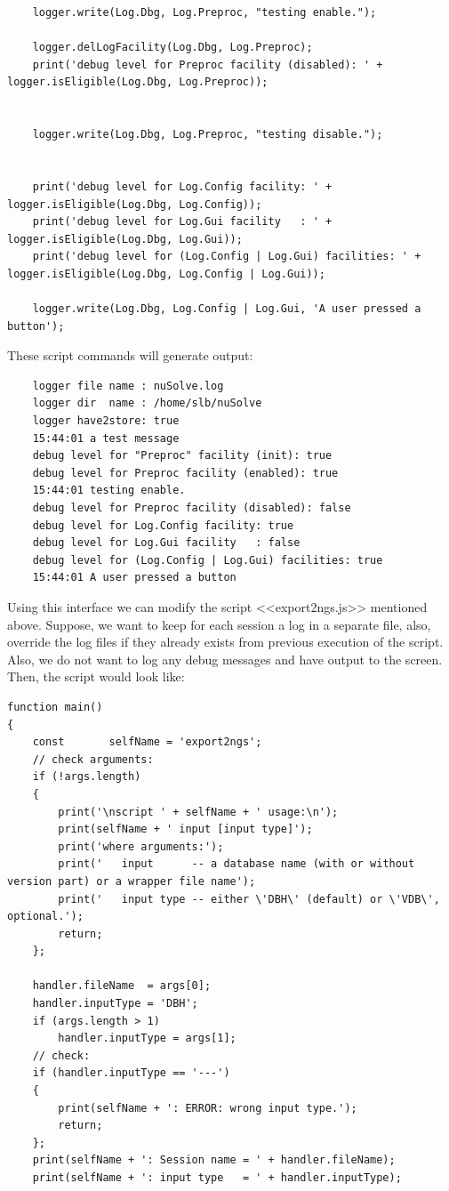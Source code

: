 \documentclass [10pt,letterpaper]{report}
\begin{document}
{{{\begin{verbatim}
    logger.write(Log.Dbg, Log.Preproc, "testing enable.");

    logger.delLogFacility(Log.Dbg, Log.Preproc);
    print('debug level for Preproc facility (disabled): ' + logger.isEligible(Log.Dbg, Log.Preproc));


    logger.write(Log.Dbg, Log.Preproc, "testing disable.");


    print('debug level for Log.Config facility: ' + logger.isEligible(Log.Dbg, Log.Config));
    print('debug level for Log.Gui facility   : ' + logger.isEligible(Log.Dbg, Log.Gui));
    print('debug level for (Log.Config | Log.Gui) facilities: ' + logger.isEligible(Log.Dbg, Log.Config | Log.Gui));

    logger.write(Log.Dbg, Log.Config | Log.Gui, 'A user pressed a button');
\end{verbatim}}
\noindent
These script commands will generate output:
{\small\begin{verbatim}
    logger file name : nuSolve.log
    logger dir  name : /home/slb/nuSolve
    logger have2store: true
    15:44:01 a test message
    debug level for "Preproc" facility (init): true
    debug level for Preproc facility (enabled): true
    15:44:01 testing enable.
    debug level for Preproc facility (disabled): false
    debug level for Log.Config facility: true
    debug level for Log.Gui facility   : false
    debug level for (Log.Config | Log.Gui) facilities: true
    15:44:01 A user pressed a button
\end{verbatim}}

Using this interface we can modify the script <<export2ngs.js>> mentioned above.
Suppose, we want to keep for each session a log in a separate file, also, override
the log files if they already exists from previous execution of the script. Also,
we do not want to log any debug messages and have output to the screen. Then, the
script would look like:
{\small\begin{verbatim}
function main()
{
    const       selfName = 'export2ngs';
    // check arguments:
    if (!args.length)
    {
        print('\nscript ' + selfName + ' usage:\n');
        print(selfName + ' input [input type]');
        print('where arguments:');
        print('   input      -- a database name (with or without version part) or a wrapper file name');
        print('   input type -- either \'DBH\' (default) or \'VDB\', optional.');
        return;
    };

    handler.fileName  = args[0];
    handler.inputType = 'DBH';
    if (args.length > 1)
        handler.inputType = args[1];
    // check:
    if (handler.inputType == '---')
    {
        print(selfName + ': ERROR: wrong input type.');
        return;
    };
    print(selfName + ': Session name = ' + handler.fileName);
    print(selfName + ': input type   = ' + handler.inputType);


\end{verbatim}}}}
\end{document}
